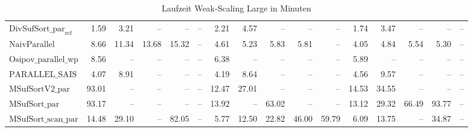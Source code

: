 \begin{table}
{\begin{tabular}{lrrrrrrrrrrrrrrr}
    $\text{DivSufSort\_par}_{\text{ref}}$ & {\color{green!60!black}1.59} & {\color{green!60!black}3.21} & {\color{darkgray}--} & {\color{darkgray}--} & {\color{darkgray}--} & {\color{green!60!black}2.21} & {\color{green!60!black}4.57} & {\color{darkgray}--} & {\color{darkgray}--} & {\color{darkgray}--} & {\color{green!60!black}1.74} & {\color{green!60!black}3.47} & {\color{darkgray}--} & {\color{darkgray}--} & {\color{darkgray}--} \\
    $\text{NaivParallel}$ & 8.66 & {\color{red}11.34} & {\color{green!60!black}13.68} & {\color{green!60!black}15.32} & {\color{darkgray}--} & 4.61 & 5.23 & {\color{green!60!black}5.83} & {\color{green!60!black}5.81} & {\color{darkgray}--} & 4.05 & 4.84 & {\color{green!60!black}5.54} & {\color{green!60!black}5.30} & {\color{darkgray}--} \\
    $\text{Osipov\_parallel\_wp}$ & 8.56 & {\color{darkgray}--} & {\color{darkgray}--} & {\color{darkgray}--} & {\color{darkgray}--} & {\color{red}6.38} & {\color{darkgray}--} & {\color{darkgray}--} & {\color{darkgray}--} & {\color{darkgray}--} & 5.89 & {\color{darkgray}--} & {\color{darkgray}--} & {\color{darkgray}--} & {\color{darkgray}--} \\
    $\text{PARALLEL\_SAIS}$ & {\color{green!60!black}4.07} & 8.91 & {\color{darkgray}--} & {\color{darkgray}--} & {\color{darkgray}--} & 4.19 & {\color{red}8.64} & {\color{darkgray}--} & {\color{darkgray}--} & {\color{darkgray}--} & 4.56 & 9.57 & {\color{darkgray}--} & {\color{darkgray}--} & {\color{darkgray}--} \\
    $\text{MSufSortV2\_par}$ & {\color{red}93.01} & {\color{darkgray}--} & {\color{darkgray}--} & {\color{darkgray}--} & {\color{darkgray}--} & {\color{red}12.47} & {\color{red}27.01} & {\color{darkgray}--} & {\color{darkgray}--} & {\color{darkgray}--} & {\color{red}14.53} & {\color{red}34.55} & {\color{darkgray}--} & {\color{darkgray}--} & {\color{darkgray}--} \\
    $\text{MSufSort\_par}$ & {\color{red}93.17} & {\color{darkgray}--} & {\color{darkgray}--} & {\color{darkgray}--} & {\color{darkgray}--} & {\color{red}13.92} & {\color{darkgray}--} & {\color{red}63.02} & {\color{darkgray}--} & {\color{darkgray}--} & {\color{red}13.12} & {\color{red}29.32} & {\color{green!60!black}66.49} & {\color{red}93.77} & {\color{darkgray}--} \\
    $\text{MSufSort\_scan\_par}$ & {\color{red}14.48} & {\color{red}29.10} & {\color{darkgray}--} & {\color{green!60!black}82.05} & {\color{darkgray}--} & 5.77 & {\color{red}12.50} & {\color{green!60!black}22.82} & {\color{green!60!black}46.00} & {\color{green!60!black}59.79} & {\color{red}6.09} & {\color{red}13.75} & {\color{darkgray}--} & {\color{green!60!black}34.87} & {\color{darkgray}--} \\
\bottomrule
\end{tabular}
}
\caption{Laufzeit Weak-Scaling Large in Minuten}
\label{messung:tab:duration-weak-large}
\end{table}

